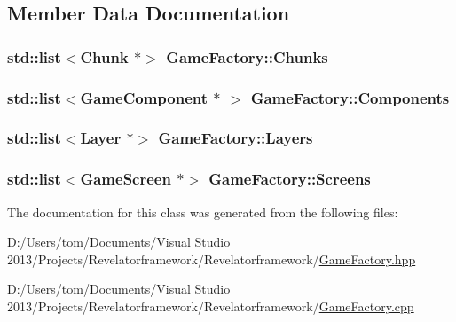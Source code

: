 \subsection{Member Data Documentation}
\hypertarget{class_game_factory_a77496a7ea1e2fa54acb18c499b3bd3bb}{
\subsubsection[{Chunks}]{\setlength{\rightskip}{0pt plus 5cm}std\-::list$<${\bf Chunk} $\ast$$>$ Game\-Factory\-::\-Chunks\hspace{0.3cm}{\ttfamily [private]}}}\label{class_game_factory_a77496a7ea1e2fa54acb18c499b3bd3bb}
\hypertarget{class_game_factory_a90fc6360610babaf3d2d880f782772b3}{
\subsubsection[{Components}]{\setlength{\rightskip}{0pt plus 5cm}std\-::list$<${\bf Game\-Component} $\ast$ $>$ Game\-Factory\-::\-Components\hspace{0.3cm}{\ttfamily [private]}}}\label{class_game_factory_a90fc6360610babaf3d2d880f782772b3}
\hypertarget{class_game_factory_a7ab6a968cb7af49813407fe66927c126}{
\subsubsection[{Layers}]{\setlength{\rightskip}{0pt plus 5cm}std\-::list$<${\bf Layer} $\ast$$>$ Game\-Factory\-::\-Layers\hspace{0.3cm}{\ttfamily [private]}}}\label{class_game_factory_a7ab6a968cb7af49813407fe66927c126}
\hypertarget{class_game_factory_a16a8135f6d6b1b60c0d08b39340b34cc}{
\subsubsection[{Screens}]{\setlength{\rightskip}{0pt plus 5cm}std\-::list$<${\bf Game\-Screen} $\ast$$>$ Game\-Factory\-::\-Screens\hspace{0.3cm}{\ttfamily [private]}}}\label{class_game_factory_a16a8135f6d6b1b60c0d08b39340b34cc}


The documentation for this class was generated from the following files\-:\begin{DoxyCompactItemize}
\item 
D\-:/\-Users/tom/\-Documents/\-Visual Studio 2013/\-Projects/\-Revelatorframework/\-Revelatorframework/\hyperlink{_game_factory_8hpp}{Game\-Factory.\-hpp}\item 
D\-:/\-Users/tom/\-Documents/\-Visual Studio 2013/\-Projects/\-Revelatorframework/\-Revelatorframework/\hyperlink{_game_factory_8cpp}{Game\-Factory.\-cpp}\end{DoxyCompactItemize}
